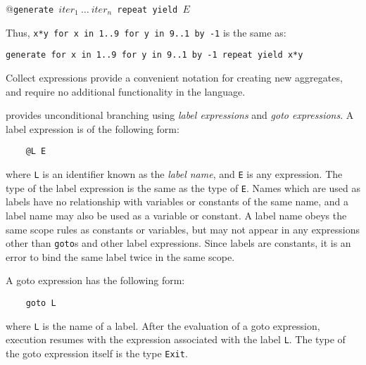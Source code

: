 \verb@   @{\tt generate ${iter}_1\ \ldots\ {iter}_n$\ repeat yield $E$}

Thus, {\tt x*y for x in 1..9 for y in 9..1 by -1} is the same as:

{\tt generate for x in 1..9 for y in 9..1 by -1 repeat yield x*y}

Collect expressions provide a convenient notation for creating new aggregates,
and require no additional functionality in the language.


\asharp{} provides unconditional branching using {\em label expressions\/}
and {\em goto expressions\/}.  A label expression is of the following form:

\begin{small}
\begin{verbatim}
    @L E
\end{verbatim}
\end{small}

where \verb"L" is an identifier known as the {\em label name},
and \verb"E" is any expression.  The type of the label expression
is the same as the type of \verb"E".  Names which are used as labels
have no relationship with variables or constants of the same name,
and a label name may also be used as a variable or constant. A label
name obeys the same scope rules as constants or variables, but may not
appear in any expressions other than {\tt goto}s and other label
expressions. Since labels are constants, it is an error to bind the
same label twice in the same scope.

A goto expression has the following form:

\begin{small}
\begin{verbatim}
    goto L
\end{verbatim}
\end{small}

where \verb"L" is the name of a label.
After the evaluation of a goto expression, execution resumes
with the expression associated with the label \verb"L".
The type of the goto expression itself is the type \verb"Exit".


